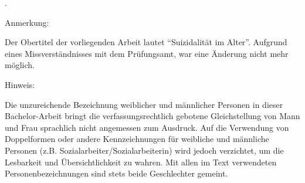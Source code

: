 \vspace*{\fill}.

\begin{flushleft}
Anmerkung:
\end{flushleft}
Der Obertitel der vorliegenden Arbeit lautet "`Suizidalität im Alter"'. Aufgrund eines Miss\-ver\-ständ\-nisses mit dem Prüfungsamt, war eine Änderung nicht mehr möglich.

\begin{flushleft}
Hinweis:
\end{flushleft}
Die unzureichende Bezeichnung weiblicher und männlicher Personen in dieser Bachelor-Arbeit bringt die verfassungsrechtlich gebotene Gleichstellung von Mann und Frau sprachlich nicht angemessen zum Ausdruck. Auf die Verwendung von Doppelformen oder andere Kennzeichnungen für weibliche und männliche Personen (z.B. So\-zial\-ar\-bei\-ter/So\-zial\-ar\-bei\-ter\-in) wird jedoch verzichtet, um die Lesbarkeit und Übersichtlichkeit zu wahren. Mit allen im Text verwendeten Personenbezeichnungen sind stets beide Geschlechter gemeint.